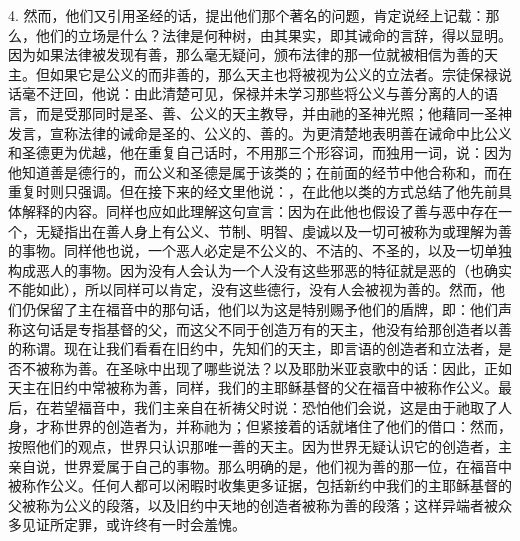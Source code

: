 4. 然而，他们又引用圣经的话，提出他们那个著名的问题，肯定说经上记载：那么，他们的立场是什么？法律是何种树，由其果实，即其诫命的言辞，得以显明。因为如果法律被发现有善，那么毫无疑问，颁布法律的那一位就被相信为善的天主。但如果它是公义的而非善的，那么天主也将被视为公义的立法者。宗徒保禄说话毫不迂回，他说：由此清楚可见，保禄并未学习那些将公义与善分离的人的语言，而是受那同时是圣、善、公义的天主教导，并由祂的圣神光照；他藉同一圣神发言，宣称法律的诫命是圣的、公义的、善的。为更清楚地表明善在诫命中比公义和圣德更为优越，他在重复自己话时，不用那三个形容词，而独用一词，说：因为他知道善是德行的，而公义和圣德是属于该类的；在前面的经节中他合称和，而在重复时则只强调。但在接下来的经文里他说：，在此他以类的方式总结了他先前具体解释的内容。同样也应如此理解这句宣言：因为在此他也假设了善与恶中存在一个，无疑指出在善人身上有公义、节制、明智、虔诚以及一切可被称为或理解为善的事物。同样他也说，一个恶人必定是不公义的、不洁的、不圣的，以及一切单独构成恶人的事物。因为没有人会认为一个人没有这些邪恶的特征就是恶的（也确实不能如此），所以同样可以肯定，没有这些德行，没有人会被视为善的。然而，他们仍保留了主在福音中的那句话，他们以为这是特别赐予他们的盾牌，即：他们声称这句话是专指基督的父，而这父不同于创造万有的天主，他没有给那创造者以善的称谓。现在让我们看看在旧约中，先知们的天主，即言语的创造者和立法者，是否不被称为善。在圣咏中出现了哪些说法？以及耶肋米亚哀歌中的话：因此，正如天主在旧约中常被称为善，同样，我们的主耶稣基督的父在福音中被称作公义。最后，在若望福音中，我们主亲自在祈祷父时说：恐怕他们会说，这是由于祂取了人身，才称世界的创造者为，并称祂为；但紧接着的话就堵住了他们的借口：然而，按照他们的观点，世界只认识那唯一善的天主。因为世界无疑认识它的创造者，主亲自说，世界爱属于自己的事物。那么明确的是，他们视为善的那一位，在福音中被称作公义。任何人都可以闲暇时收集更多证据，包括新约中我们的主耶稣基督的父被称为公义的段落，以及旧约中天地的创造者被称为善的段落；这样异端者被众多见证所定罪，或许终有一时会羞愧。\par

